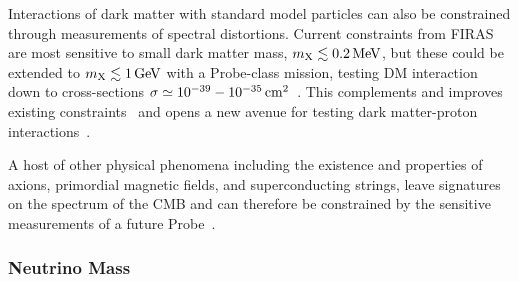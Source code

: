 Interactions of dark matter with standard model particles can also be constrained through 
measurements of spectral distortions\cite{Yacine2015DM}. 
Current constraints from FIRAS are most sensitive to small dark matter
mass, $m_{\rm X}\lesssim 0.2\,{\rm MeV}$, but these could be extended to $m_{\rm X}\lesssim 1\,{\rm GeV}$ with a 
Probe-class mission, testing DM interaction down to cross-sections 
$\sigma\simeq 10^{-39}-10^{-35}\,{\rm cm}^2$~\cite{Yacine2015DM}. This complements and improves 
existing constraints~\cite{Essig2012PhRvL.109b1301E, Boehm2014MNRAS.445L..31B} 
and opens a new avenue for testing dark matter-proton interactions~\cite{Yacine2015DM}.

A host of other physical phenomena including the existence and properties of axions, primordial magnetic fields, and 
superconducting strings, leave signatures on the spectrum of the CMB and can therefore be constrained by 
the sensitive measurements  of a future Probe~\cite[e.g.,][]{Jedamzik2000, Tashiro2012, Dolgov2013, Tashiro2013, Caldwell2013}.


\vspace{-0.15in}

\subsubsection{Neutrino Mass}

\vspace{-0.05in}

